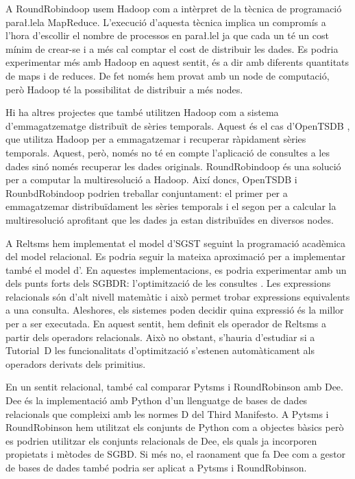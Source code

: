 
A RoundRobindoop usem Hadoop com a intèrpret de la tècnica de
programació para\l.lela MapReduce. L'execució d'aquesta tècnica
implica un compromís a l'hora d'escollir el nombre de processos en
para\l.lel ja que cada un té un cost mínim de crear-se i a més cal
comptar el cost de distribuir les dades. Es podria experimentar més
amb Hadoop en aquest sentit, és a dir amb diferents quantitats de maps
i de reduces. De fet només hem provat amb un node de computació, però
Hadoop té la possibilitat de distribuir a més nodes.


Hi ha altres projectes que també utilitzen Hadoop com a sistema
d'emmagatzematge distribuït de sèries temporals. Aquest és el cas
d'OpenTSDB \parencite{opentsdb}, que utilitza Hadoop per a
emmagatzemar i recuperar ràpidament sèries temporals.  Aquest, però,
només no té en compte l'aplicació de consultes a les dades sinó només
recuperar les dades originals.  RoundRobindoop és una solució per a
computar la multiresolució a Hadoop. Així doncs, OpenTSDB i
RounbdRobindoop podrien treballar conjuntament: el primer per a
emmagatzemar distribuïdament les sèries temporals i el segon per a
calcular la multiresolució aprofitant que les dades ja estan
distribuïdes en diversos nodes.





A Reltsms hem implementat el model d'\gls{SGST} seguint la programació
acadèmica del model relacional. Es podria seguir la mateixa
aproximació per a implementar també el model d'.  En
aquestes implementacions, es podria experimentar amb un dels punts
forts dels \gls{SGBDR}: l'optimització de les
consultes \parencite[\gls{capitol}~18
\emph{Optimization}]{date04:introduction8}. Les expressions
relacionals són d'alt nivell matemàtic i això permet trobar
expressions equivalents a una consulta. Aleshores, els sistemes poden
decidir quina expressió és la millor per a ser executada.  En aquest
sentit, hem definit els operador de Reltsms a partir dels operadors
relacionals. Això no obstant, s'hauria d'estudiar si a Tutorial~D les
funcionalitats d'optimització s'estenen automàticament als operadors
derivats dels primitius.



En un sentit relacional, també cal comparar Pytsms i RoundRobinson amb
Dee. Dee \parencite{dee} és la implementació amb Python d'un
llenguatge de bases de dades relacionals que compleixi amb les normes
D del Third Manifesto. A Pytsms i RoundRobinson hem utilitzat els
conjunts de Python com a objectes bàsics però es podrien utilitzar els
conjunts relacionals de Dee, els quals ja incorporen propietats i
mètodes de \gls{SGBD}. Si més no, el raonament que fa Dee com a gestor
de bases de dades també podria ser aplicat a Pytsms i
RoundRobinson.
  



